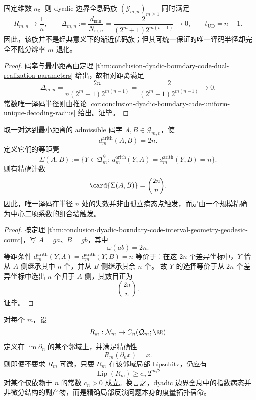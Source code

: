 \begin{corollary}\label{cor:conclusion-dyadic-boundary-positive-rate-zero-distance-constant-radius}
固定维数 \(n\)。则 dyadic 边界全息码族 \((\mathcal G_{m,n})_{m\ge 1}\) 同时满足
\[
R_{m,n}\longrightarrow \frac1n,
\qquad
\Delta_{m,n}
:=
\frac{d_{\min}}{N_{m,n}}
=
\frac{2}{(2^m+1)2^{m(n-1)}}
\longrightarrow 0,
\qquad
t_{\mathrm{UD}}=n-1.
\]
因此，该族并不是经典意义下的渐近优码族；但其可统一保证的唯一译码半径却完全不随分辨率 \(m\) 退化。
\end{corollary}
\begin{proof}
码率与最小距离由定理 \ref{thm:conclusion-dyadic-boundary-code-dual-realization-parameters} 给出，故相对距离满足
\[
\Delta_{m,n}
=
\frac{2n}{n(2^m+1)2^{m(n-1)}}
=
\frac{2}{(2^m+1)2^{m(n-1)}}
\longrightarrow 0.
\]
常数唯一译码半径则由推论 \ref{cor:conclusion-dyadic-boundary-code-uniform-unique-decoding-radius} 给出。证毕。
\end{proof}

\begin{proposition}\label{prop:conclusion-dyadic-boundary-code-central-binomial-wall}
取一对达到最小距离的 admissible 码字 \(A,B\in \mathcal G_{m,n}\)，使
\[
d_m^{\mathrm{arith}}(A,B)=2n.
\]
定义它们的等距壳
\[
\Sigma(A,B):=
\{Y\in \mathfrak Q_m^\partial:\ d_m^{\mathrm{arith}}(Y,A)=d_m^{\mathrm{arith}}(Y,B)=n\}.
\]
则有精确计数
\[
\card{\Sigma(A,B)}=\binom{2n}{n}.
\]
因此，唯一译码在半径 \(n\) 处的失效并非由孤立病态点触发，而是由一个规模精确为中心二项系数的组合墙触发。
\end{proposition}
\begin{proof}
按定理 \ref{thm:conclusion-dyadic-boundary-code-interval-geometry-geodesic-count}，写 \(A=ga\)、\(B=gb\)，其中
\[
\omega(ab)=2n.
\]
等距条件
\(
d_m^{\mathrm{arith}}(Y,A)=d_m^{\mathrm{arith}}(Y,B)=n
\)
等价于：在这 \(2n\) 个差异坐标中，\(Y\) 恰从 \(A\)-侧继承其中 \(n\) 个，并从 \(B\)-侧继承其余 \(n\) 个。
故 \(Y\) 的选择等价于从 \(2n\) 个差异坐标中选出 \(n\) 个归于 \(A\)-侧，其数目正为
\[
\binom{2n}{n}.
\]
证毕。
\end{proof}

\begin{conjecture}\label{conj:conclusion-dyadic-boundary-local-lipschitz-blowup}
对每个 \(m\)，设
\[
R_m:\mathcal N_m\to C_n(\mathcal Q_m;\RR)
\]
定义在 \(\operatorname{im}\partial_n\) 的某个邻域上，并满足精确性
\[
R_m(\partial_n x)=x.
\]
则即便不要求 \(R_m\) 可微，只要 \(R_m\) 在该邻域局部 Lipschitz，仍应有
\[
\operatorname{Lip}(R_m)\ge c_n\,2^{m/2}
\]
对某个仅依赖于 \(n\) 的常数 \(c_n>0\) 成立。换言之，dyadic 边界全息中的指数病态并非微分结构的副产物，而是精确局部反演问题本身的度量拓扑宿命。
\end{conjecture}


